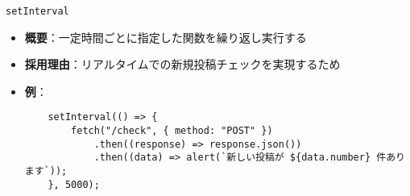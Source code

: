 \documentclass[uplatex,dvipdfmx]{jsarticle}
\begin{document}
\texttt{setInterval}
\begin{itemize}
    \item \textbf{概要}：一定時間ごとに指定した関数を繰り返し実行する
    \item \textbf{採用理由}：リアルタイムでの新規投稿チェックを実現するため
    \item \textbf{例}：
    \begin{verbatim}
    setInterval(() => {
        fetch("/check", { method: "POST" })
            .then((response) => response.json())
            .then((data) => alert(`新しい投稿が ${data.number} 件あります`));
    }, 5000);
    \end{verbatim}
\end{itemize}
\end{document}
